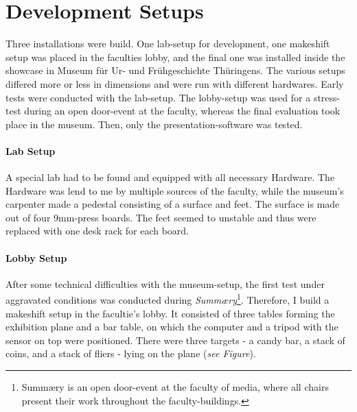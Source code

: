 
%


\section{Development Setups}
\label{setup_development}

Three installations were build. One lab-setup for development, one makeshift setup was placed in the faculties lobby, and the final one was installed inside the showcase in Museum für Ur- und Frühgeschichte Thüringens. The various setups differed more or less in dimensions and were run with different hardwares. Early tests were conducted with the lab-setup. The lobby-setup was used for a stress-test during an open door-event at the faculty, whereas the final evaluation took place in the museum. Then, only the presentation-software was tested.

\paragraph{Lab Setup} A special lab had to be found and equipped with all necessary Hardware. The Hardware was lend to me by multiple sources of the faculty, while the museum's carpenter made a pedestal consisting of a surface and feet. The surface is made out of four 9mm-press boards. The feet seemed to unstable and thus were replaced with one desk rack for each board.


\paragraph{Lobby Setup} After some technical difficulties with the museum-setup, the first test under aggravated conditions was conducted during \textit{Summ\ae{}ry}\footnote{Summ\ae{}ry is an open door-event at the faculty of media, where all chairs present their work throughout the faculty-buildings.}. Therefore, I build a makeshift setup in the facultie's lobby. It consisted of three tables forming the exhibition plane and a bar table, on which the computer and a tripod with the sensor on top were positioned. There were three targets - a candy bar, a stack of coins, and a stack of fliers - lying on the plane (\textit{see Figure}).
\\

